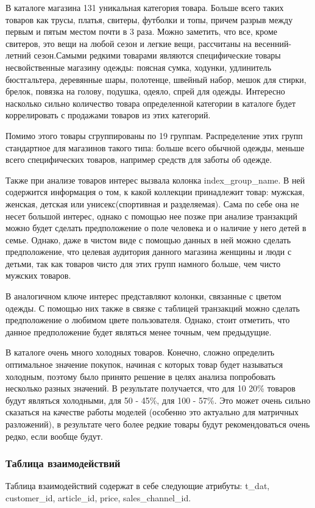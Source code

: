 \documentclass[bachelor, och, coursework]{SCWorks}
\begin{document}
В каталоге магазина 131 уникальная категория товара. Больше всего таких товаров как трусы, платья, свитеры, футболки и топы, причем разрыв между первым и пятым местом почти в 3 раза. Можно заметить, что все, кроме свитеров, это вещи на любой сезон и легкие вещи, рассчитаны на весенний-летний сезон.Самыми редкими товарами являются специфические товары несвойственные магазину одежды: поясная сумка, ходунки, удлинитель бюстгальтера, деревянные шары, полотенце, швейный набор, мешок для стирки, брелок, повязка на голову, подушка, одеяло, спрей для одежды. Интересно насколько сильно количество товара определенной категории в каталоге будет коррелировать с продажами товаров из этих категорий. 

Помимо этого товары сгруппированы по 19 группам. Распределение этих групп стандартное для магазинов такого типа: больше всего обычной одежды, меньше всего специфических товаров, например средств для заботы об одежде.

Также при анализе товаров интерес вызвала колонка index_group_name.
В ней содержится информация о том, к какой коллекции принадлежит товар: мужская, женская, детская или унисекс(спортивная и разделяемая). Сама по себе она не несет большой интерес, однако с помощью нее позже при анализе транзакций можно будет сделать предположение о поле человека и о наличие у него детей в семье. Однако, даже в чистом виде с помощью данных в ней можно сделать предположение, что целевая аудитория данного магазина женщины и люди с детьми, так как товаров чисто для этих групп намного больше, чем чисто мужских товаров.

В аналогичном ключе интерес представляют колонки, связанные с цветом одежды. С помощью них также в связке с таблицей транзакций можно сделать предположение о любимом цвете пользователя. Однако, стоит отметить, что данное предположение будет являться менее точным, чем предыдущие.

В каталоге очень много холодных товаров. Конечно, сложно определить оптимальное значение покупок, начиная с которых товар будет называться холодным, поэтому было принято решение в целях анализа попробовать несколько разных значений. В результате получается, что для 10 20\% товаров будут являться холодными, для 50 - 45\%, для 100 - 57\%. Это может очень сильно сказаться на качестве работы моделей (особенно это актуально для матричных разложений), в результате чего более редкие товары будут рекомендоваться очень редко, если вообще будут.

\subsubsection{Таблица взаимодействий}
Таблица взаимодействий содержат в себе следующие атрибуты: t_dat, customer_id, article_id, price, sales_channel_id.
\end{document}
